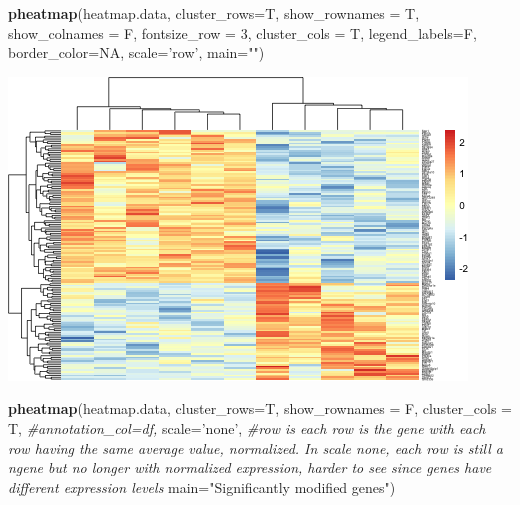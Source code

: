 \documentclass[]{article}
\newenvironment{Shaded}{\begin{snugshade}}{\end{snugshade}}
\newcommand{\CommentTok}[1]{\textcolor[rgb]{0.56,0.35,0.01}{\textit{#1}}}
\newcommand{\DataTypeTok}[1]{\textcolor[rgb]{0.13,0.29,0.53}{#1}}
\newcommand{\DecValTok}[1]{\textcolor[rgb]{0.00,0.00,0.81}{#1}}
\newcommand{\KeywordTok}[1]{\textcolor[rgb]{0.13,0.29,0.53}{\textbf{#1}}}
\newcommand{\NormalTok}[1]{#1}
\newcommand{\OtherTok}[1]{\textcolor[rgb]{0.56,0.35,0.01}{#1}}
\newcommand{\StringTok}[1]{\textcolor[rgb]{0.31,0.60,0.02}{#1}}
\begin{document}
\begin{Shaded}
\begin{Highlighting}[]
\KeywordTok{pheatmap}\NormalTok{(heatmap.data,}
         \DataTypeTok{cluster_rows=}\NormalTok{T,}
         \DataTypeTok{show_rownames =}\NormalTok{ T,}
         \DataTypeTok{show_colnames =}\NormalTok{ F,}
         \DataTypeTok{fontsize_row =} \DecValTok{3}\NormalTok{,}
         \DataTypeTok{cluster_cols =}\NormalTok{ T,}
         \DataTypeTok{legend_labels=}\NormalTok{F,}
         \DataTypeTok{border_color=}\OtherTok{NA}\NormalTok{,}
         \DataTypeTok{scale=}\StringTok{'row'}\NormalTok{,}
         \DataTypeTok{main=}\StringTok{""}\NormalTok{)}
\end{Highlighting}
\end{Shaded}

\includegraphics{figures-noura/heatmap-2.png}

\begin{Shaded}
\begin{Highlighting}[]
\KeywordTok{pheatmap}\NormalTok{(heatmap.data,}
         \DataTypeTok{cluster_rows=}\NormalTok{T,}
         \DataTypeTok{show_rownames =}\NormalTok{ F,}
         \DataTypeTok{cluster_cols =}\NormalTok{ T,}
         \CommentTok{#annotation_col=df,}
         \DataTypeTok{scale=}\StringTok{'none'}\NormalTok{, }\CommentTok{#row is each row is the gene with each row having the same average value, normalized. In scale none, each row is still a ngene but no longer with normalized expression, harder to see since genes have different expression levels }
         \DataTypeTok{main=}\StringTok{"Significantly modified genes"}\NormalTok{)}
\end{Highlighting}
\end{Shaded}
\end{document}
